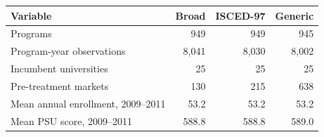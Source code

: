 \begin{tabular}{lrrr}
\toprule
Variable & Broad & ISCED-97 & Generic \\
\midrule
Programs &       949 &       949 &       945 \\
Program-year observations &     8,041 &     8,030 &     8,002 \\
Incumbent universities &        25 &        25 &        25 \\
Pre-treatment markets &       130 &       215 &       638 \\
Mean annual enrollment, 2009--2011 &  53.2 &  53.2 &  53.2 \\
Mean PSU score, 2009--2011 & 588.8 & 588.8 & 589.0 \\
\bottomrule
\end{tabular}
